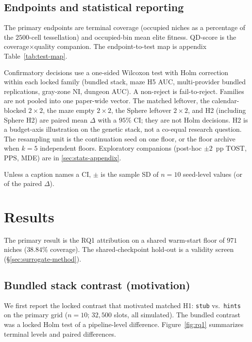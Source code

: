 \documentclass[preprint,12pt]{elsarticle}
\begin{document}
\subsection{Endpoints and statistical reporting}
\label{sec:stats}

The primary endpoints are terminal coverage (occupied niches as a percentage of the $2500$-cell tessellation) and occupied-bin mean elite fitness. QD-score is the coverage$\times$quality companion. The endpoint-to-test map is appendix Table~\ref{tab:test-map}.

Confirmatory decisions use a one-sided Wilcoxon test with Holm correction within each locked family (bundled stack, maze H5 AUC, multi-provider bundled replications, gray-zone NI, dungeon AUC). A non-reject is fail-to-reject. Families are not pooled into one paper-wide vector. The matched leftover, the calendar-blocked $2\times2$, the maze empty $2\times2$, the Sphere leftover $2\times2$, and H2 (including Sphere H2) are paired mean $\Delta$ with a $95\%$ CI; they are not Holm decisions. H2 is a budget-axis illustration on the genetic stack, not a co-equal research question. The resampling unit is the continuation seed on one floor, or the floor archive when $k{=}5$ independent floors. Exploratory companions (post-hoc $\pm 2$~pp TOST, $\mathrm{PPS}$, MDE) are in \ref{sec:stats-appendix}.

Unless a caption names a CI, $\pm$ is the sample SD of $n{=}10$ seed-level values (or of the paired $\Delta$).

\section{Results}
\label{sec:results}

The primary result is the RQ1 attribution on a shared warm-start floor of $971$ niches ($38.84$\% coverage). The shared-checkpoint hold-out is a validity screen (\S\ref{sec:surrogate-method}).

\subsection{Bundled stack contrast (motivation)}

We first report the locked contrast that motivated matched H1: \texttt{stub} vs.\ \texttt{hints} on the primary grid ($n=10$; $32{,}500$ slots, all simulated). The bundled contrast was a locked Holm test of a pipeline-level difference. Figure~\ref{fig:rq1} summarizes terminal levels and paired differences.
\end{document}
